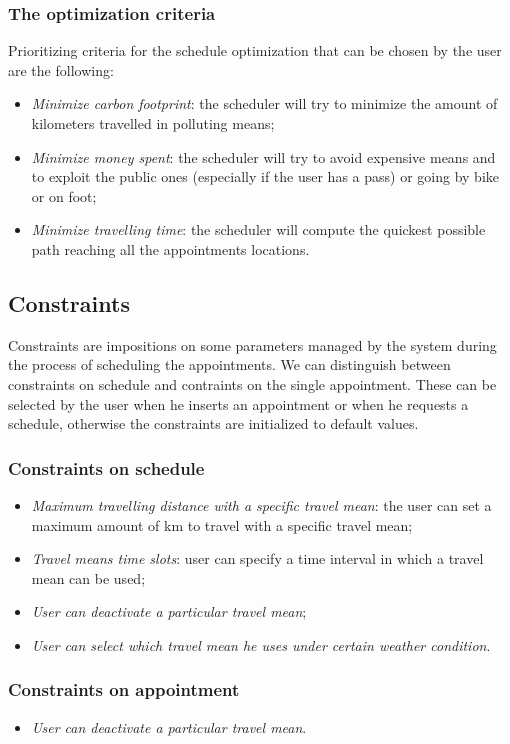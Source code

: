  
\subsubsection{The optimization criteria} \label{subsubsect:optcriteria} 
Prioritizing criteria for the schedule optimization that can be chosen by the user are the following:
\begin{itemize}
\item \textit{Minimize carbon footprint}: the scheduler will try to minimize the amount of kilometers travelled in polluting means;
\item \textit{Minimize money spent}: the scheduler will try to avoid expensive means and to exploit the public ones (especially if the user has a pass) or going by bike or on foot;
\item \textit{Minimize travelling time}: the scheduler will compute the quickest possible path reaching all the appointments locations.
\end{itemize}

\subsection{Constraints}
Constraints are impositions on some parameters managed by the system during the process of scheduling the appointments. We can distinguish between constraints on schedule and contraints on the single appointment. These can be selected by the user when he inserts an appointment or when he requests a schedule, otherwise the constraints are initialized to default values. 

\subsubsection{Constraints on schedule} 
\begin{itemize}
\item \textit{Maximum travelling distance with a specific travel mean}: the user can set a maximum amount of km to travel with a specific travel mean;
\item\textit{ Travel means time slots}: user can specify a time interval in which a travel mean can be used;
\item \textit{User can deactivate a particular travel mean};
\item \textit{User can select which travel mean he uses under certain weather condition}.
\end{itemize}

\subsubsection{Constraints on appointment} \label{subsubsect:constronappoint}
\begin{itemize}
\item \textit{User can deactivate a particular travel mean}.
\end{itemize}

